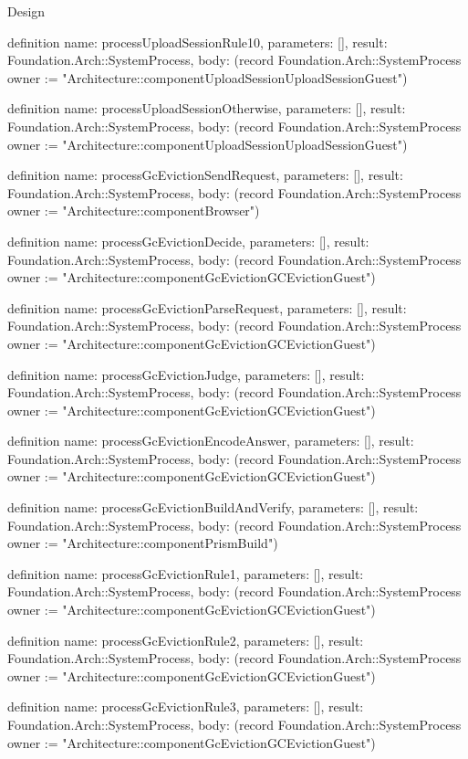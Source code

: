 \begin{lexlean}{Design}
\begin{semanticmodule}
definition{
  name: processUploadSessionRule10,
  parameters: [],
  result: Foundation.Arch::SystemProcess,
  body: (record Foundation.Arch::SystemProcess {owner := "Architecture::componentUploadSessionUploadSessionGuest"})
}

definition{
  name: processUploadSessionOtherwise,
  parameters: [],
  result: Foundation.Arch::SystemProcess,
  body: (record Foundation.Arch::SystemProcess {owner := "Architecture::componentUploadSessionUploadSessionGuest"})
}

definition{
  name: processGcEvictionSendRequest,
  parameters: [],
  result: Foundation.Arch::SystemProcess,
  body: (record Foundation.Arch::SystemProcess {owner := "Architecture::componentBrowser"})
}

definition{
  name: processGcEvictionDecide,
  parameters: [],
  result: Foundation.Arch::SystemProcess,
  body: (record Foundation.Arch::SystemProcess {owner := "Architecture::componentGcEvictionGCEvictionGuest"})
}

definition{
  name: processGcEvictionParseRequest,
  parameters: [],
  result: Foundation.Arch::SystemProcess,
  body: (record Foundation.Arch::SystemProcess {owner := "Architecture::componentGcEvictionGCEvictionGuest"})
}

definition{
  name: processGcEvictionJudge,
  parameters: [],
  result: Foundation.Arch::SystemProcess,
  body: (record Foundation.Arch::SystemProcess {owner := "Architecture::componentGcEvictionGCEvictionGuest"})
}

definition{
  name: processGcEvictionEncodeAnswer,
  parameters: [],
  result: Foundation.Arch::SystemProcess,
  body: (record Foundation.Arch::SystemProcess {owner := "Architecture::componentGcEvictionGCEvictionGuest"})
}

definition{
  name: processGcEvictionBuildAndVerify,
  parameters: [],
  result: Foundation.Arch::SystemProcess,
  body: (record Foundation.Arch::SystemProcess {owner := "Architecture::componentPrismBuild"})
}

definition{
  name: processGcEvictionRule1,
  parameters: [],
  result: Foundation.Arch::SystemProcess,
  body: (record Foundation.Arch::SystemProcess {owner := "Architecture::componentGcEvictionGCEvictionGuest"})
}

definition{
  name: processGcEvictionRule2,
  parameters: [],
  result: Foundation.Arch::SystemProcess,
  body: (record Foundation.Arch::SystemProcess {owner := "Architecture::componentGcEvictionGCEvictionGuest"})
}

definition{
  name: processGcEvictionRule3,
  parameters: [],
  result: Foundation.Arch::SystemProcess,
  body: (record Foundation.Arch::SystemProcess {owner := "Architecture::componentGcEvictionGCEvictionGuest"})
}


\end{semanticmodule}
\end{lexlean}
